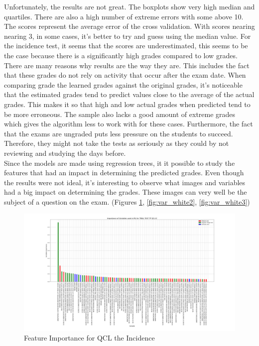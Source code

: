 \documentclass[a4paper,11pt]{report}
\numberwithin{figure}{section} %
\begin{document}
    Unfortunately, the results are not great. The boxplots show very high median and quartiles. There are also a high number of extreme errors with some above 10. The scores represent the average error of the cross validation. With scores nearing nearing 3, in some cases, it's better to try and guess using the median value. For the incidence test, it seems that the scores are underestimated, this seems to be the case because there is a significantly high grades compared to low grades. There are many reasons why results are the way they are. This includes the fact that these grades do not rely on activity that occur after the exam date. When comparing grade the learned grades against the original grades, it's noticeable that the estimated grades tend to predict values close to the average of the actual grades. This makes it so that high and low actual grades when predicted tend to be more erroneous. The sample also lacks a good amount of extreme grades which gives the algorithm less to work with for these cases. Furthermore, the fact that the exams are ungraded puts less pressure on the students to succeed. Therefore, they might not take the tests as seriously as they could by not reviewing and studying the days before. \\
  
  Since the models are made using regression trees, it it possible to study the features that had an impact in determining the predicted grades. Even though the results were not ideal, it's interesting to observe what images and variables had a big impact on determining the grades. These images can very well be the subject of a question on the exam. (Figures \ref{fig:var_white1}, \ref{fig:var_white2}, \ref{fig:var_white3})

     \begin{figure}[H]
      \centering
      \includegraphics[width=.95\linewidth]{var_importance_TRIAL_TEST_TP_QCL_IC_2018-04-29_14_31_17.png}
      \caption{Feature Importance for QCL the Incidence}
      \label{fig:var_white1}
      \end{figure}
      
\end{document}
